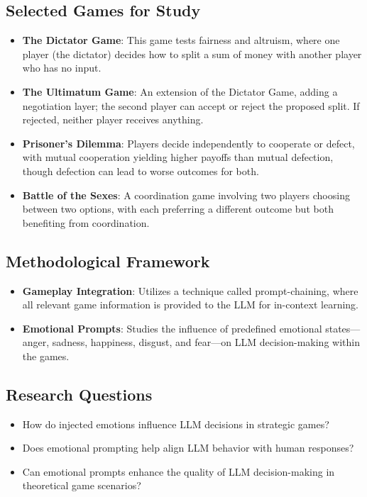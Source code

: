 \documentclass{article}
\begin{document}
\subsection{Selected Games for Study}
\begin{itemize}
    \item \textbf{The Dictator Game}: This game tests fairness and altruism, where one player (the dictator) decides how to split a sum of money with another player who has no input.
    \item \textbf{The Ultimatum Game}: An extension of the Dictator Game, adding a negotiation layer; the second player can accept or reject the proposed split. If rejected, neither player receives anything.
    \item \textbf{Prisoner's Dilemma}: Players decide independently to cooperate or defect, with mutual cooperation yielding higher payoffs than mutual defection, though defection can lead to worse outcomes for both.
    \item \textbf{Battle of the Sexes}: A coordination game involving two players choosing between two options, with each preferring a different outcome but both benefiting from coordination.
\end{itemize}

\subsection{Methodological Framework}
\begin{itemize}
    \item \textbf{Gameplay Integration}: Utilizes a technique called prompt-chaining, where all relevant game information is provided to the LLM for in-context learning.
    \item \textbf{Emotional Prompts}: Studies the influence of predefined emotional states—anger, sadness, happiness, disgust, and fear—on LLM decision-making within the games.
\end{itemize}

\subsection{Research Questions}
\begin{itemize}
    \item How do injected emotions influence LLM decisions in strategic games?
    \item Does emotional prompting help align LLM behavior with human responses?
    \item Can emotional prompts enhance the quality of LLM decision-making in theoretical game scenarios?
\end{itemize}
\end{document}
